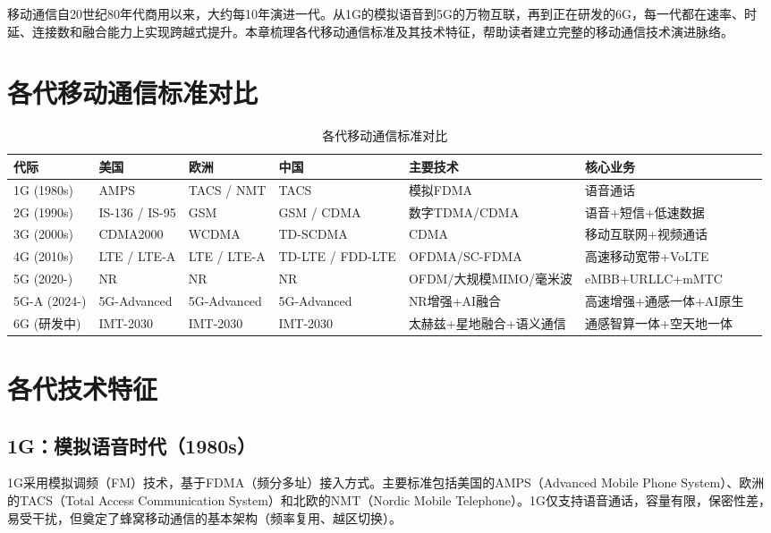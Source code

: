 \documentclass[12pt,UTF8]{ctexbook}
\begin{document}
移动通信自20世纪80年代商用以来，大约每10年演进一代。从1G的模拟语音到5G的万物互联，再到正在研发的6G，每一代都在速率、时延、连接数和融合能力上实现跨越式提升。本章梳理各代移动通信标准及其技术特征，帮助读者建立完整的移动通信技术演进脉络。

\section{各代移动通信标准对比}
\label{sec:mobile_generations}

\begin{table}[htbp]
\centering
\caption{各代移动通信标准对比}
\label{tab:mobile_generations}
\begin{tabular}{@{}lllllp{3.5cm}p{3cm}@{}}
    \toprule
    \textbf{代际} & \textbf{美国} & \textbf{欧洲} & \textbf{中国} & \textbf{主要技术} & \textbf{核心业务} \\
    \midrule
    1G (1980s) & AMPS & TACS / NMT & TACS & 模拟FDMA & 语音通话 \\
    2G (1990s) & IS-136 / IS-95 & GSM & GSM / CDMA & 数字TDMA/CDMA & 语音+短信+低速数据 \\
    3G (2000s) & CDMA2000 & WCDMA & TD-SCDMA & CDMA & 移动互联网+视频通话 \\
    4G (2010s) & LTE / LTE-A & LTE / LTE-A & TD-LTE / FDD-LTE & OFDMA/SC-FDMA & 高速移动宽带+VoLTE \\
    5G (2020-) & NR & NR & NR & OFDM/大规模MIMO/毫米波 & eMBB+URLLC+mMTC \\
    5G-A (2024-) & 5G-Advanced & 5G-Advanced & 5G-Advanced & NR增强+AI融合 & 高速增强+通感一体+AI原生 \\
    6G (研发中) & IMT-2030 & IMT-2030 & IMT-2030 & 太赫兹+星地融合+语义通信 & 通感智算一体+空天地一体 \\
    \bottomrule
\end{tabular}
\end{table}

\section{各代技术特征}
\label{sec:mobile_features}

\subsection{1G：模拟语音时代（1980s）}
1G采用模拟调频（FM）技术，基于FDMA（频分多址）接入方式。主要标准包括美国的AMPS（Advanced Mobile Phone System）、欧洲的TACS（Total Access Communication System）和北欧的NMT（Nordic Mobile Telephone）。1G仅支持语音通话，容量有限，保密性差，易受干扰，但奠定了蜂窝移动通信的基本架构（频率复用、越区切换）。
\end{document}
